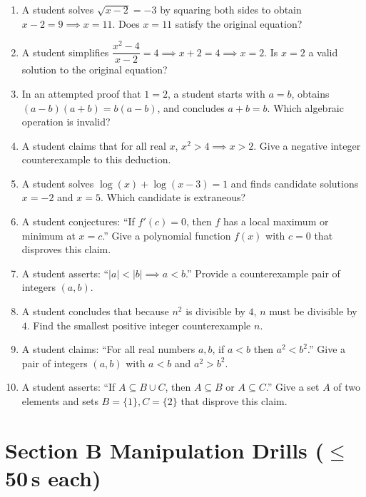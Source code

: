 \documentclass[11pt,a4paper]{article}
\begin{document}
\begin{enumerate}

\item A student solves $\sqrt{x-2} = -3$ by squaring both sides to obtain $x-2 = 9 \implies x=11$. Does $x=11$ satisfy the original equation?

\item A student simplifies $\dfrac{x^2-4}{x-2} = 4 \implies x+2 = 4 \implies x=2$. Is $x=2$ a valid solution to the original equation?

\item In an attempted proof that $1=2$, a student starts with $a=b$, obtains $(a-b)(a+b) = b(a-b)$, and concludes $a+b = b$. Which algebraic operation is invalid?

\item A student claims that for all real $x$, $x^2 > 4 \implies x > 2$. Give a negative integer counterexample to this deduction.

\item A student solves $\log(x) + \log(x-3) = 1$ and finds candidate solutions $x = -2$ and $x = 5$. Which candidate is extraneous?

\item A student conjectures: ``If $f'(c) = 0$, then $f$ has a local maximum or minimum at $x=c$.'' Give a polynomial function $f(x)$ with $c=0$ that disproves this claim.

\item A student asserts: ``$|a| < |b| \implies a < b$.'' Provide a counterexample pair of integers $(a, b)$.

\item A student concludes that because $n^2$ is divisible by $4$, $n$ must be divisible by $4$. Find the smallest positive integer counterexample $n$.

\item A student claims: ``For all real numbers $a, b$, if $a < b$ then $a^2 < b^2$.'' Give a pair of integers $(a, b)$ with $a < b$ and $a^2 > b^2$.

\item A student asserts: ``If $A \subseteq B \cup C$, then $A \subseteq B$ or $A \subseteq C$.'' Give a set $A$ of two elements and sets $B=\{1\}, C=\{2\}$ that disprove this claim.

\end{enumerate}

\section*{Section B \quad Manipulation Drills \hfill{\normalfont\small($\leq$50\,s each)}}
\end{document}
